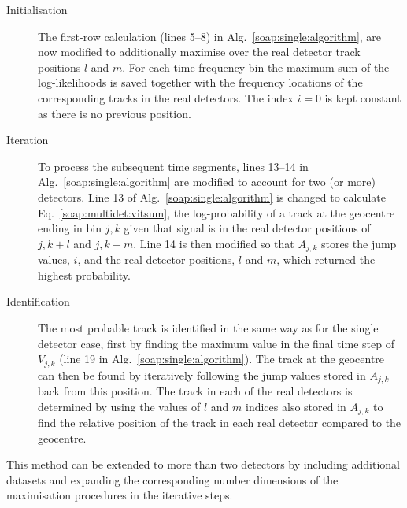 \begin{description}
\item[Initialisation] The first-row calculation (lines 5--8) in Alg.~\ref{soap:single:algorithm}, are now modified to additionally maximise over the real detector track positions $l$ and $m$. For each time-frequency bin the maximum sum of the log-likelihoods is saved together with the frequency locations of the corresponding tracks in the real detectors. The index $i=0$ is kept constant as there is no previous position.

\item[Iteration] To process the subsequent time segments, lines 13--14 in Alg.~\ref{soap:single:algorithm} are modified to account for two (or more) detectors. Line 13 of Alg.~\ref{soap:single:algorithm} is changed to calculate Eq.~\ref{soap:multidet:vitsum}, the log-probability of a track at the geocentre ending in bin $j,k$ given that signal is in the real detector positions of $j,k+l$ and $j,k+m$. Line 14 is then modified so that $A_{j,k}$ stores the jump values, $i$, and the real detector positions, $l$ and $m$, which returned the highest probability.

\item[Identification] The most probable track is identified in the same way as for the single detector case, first by finding the maximum value in the final time step of $V_{j,k}$ (line 19 in Alg.~\ref{soap:single:algorithm}). The track at the geocentre can then be found by iteratively following the jump values stored in $A_{j,k}$ back from this position. The track in each of the real detectors is determined by using the values of $l$ and $m$ indices also stored in $A_{j,k}$ to find the relative position of the track in each real detector compared to the geocentre.
%
\end{description}

This method can be extended to more than two detectors by including additional datasets and expanding the corresponding number dimensions of the maximisation procedures in the iterative steps.

